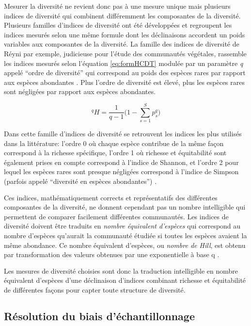 \documentclass[
  11pt,
  french,
  A4paper,
  extrafontsizes,onecolumn,openright
  ]{memoir}
\begin{document}
Mesurer la diversité ne revient donc pas à une mesure unique mais
plusieurs indices de diversité qui combinent différemment les
composantes de la diversité. Plusieurs familles d'indices de diversité
ont été développées et regroupent les indices mesurés selon une même
formule dont les déclinaisons accordent un poids variables aux
composantes de la diversité. La famille des indices de diversité de
Réyni par exemple, judicieuse pour l'étude des communautés végétales,
rassemble les indices mesurés selon l'équation \eqref{eq:formHCDT} modulée
par un paramètre \emph{q} appelé ``ordre de diversité'' qui correspond
au poids des espèces rares par rapport aux espèces abondantes
\autocite{Mendes2008}. Plus l'ordre de diversité est élevé, plus les
espèces rares sont négligées par rapport aux espèces abondantes.

\begin{equation}
{^{q}H=\frac{1}{q-1}\Bigg(1-\displaystyle\sum_{s=1}^{S}p^q_s\Bigg) }
\label{eq:formHCDT}
\end{equation}

Dans cette famille d'indices de diversité se retrouvent les indices les
plus utilisés dans la littérature: l'ordre 0 où chaque espèce contribue
de la même façon correspond à la richesse spécifique, l'ordre 1 où
richesse et équitabilité sont également prises en compte correspond à
l'indice de Shannon, et l'ordre 2 pour lequel les espèces rares sont
presque négligées correspond à l'indice de Simpson (parfois appelé
``diversité en espèces abondantes'')
\autocites{Shannon1948}{Simpson1949}{Patil1982}{Tothmeresz1995}.

Ces indices, mathématiquement corrects et représentatifs des différentes
composantes de la diversité, ne donnent cependant pas un nombre
intelligible qui permettent de comparer facilement différentes
communautés. Les indices de diversité doivent être traduits en
\emph{nombre équivalent d'espèces} qui correspond au nombre d'espèces
qu'aurait la communauté étudiée si toutes les espèces avaient la même
abondance. Ce nombre équivalent d'espèces, ou \emph{nombre de Hill}, est
obtenu par transformation des valeurs obtenues par une exponentielle à
base q \autocite{Hill1973}.

Les mesures de diversité choisies sont donc la traduction intelligible
en nombre équivalent d'espèces d'une déclinaison d'indices combinant
richesse et équitabilité de différentes façons pour capter toute
structure de diversité.

\subsection{Résolution du biais
d'échantillonnage}\label{resolution-du-biais-dechantillonnage}
\end{document}
